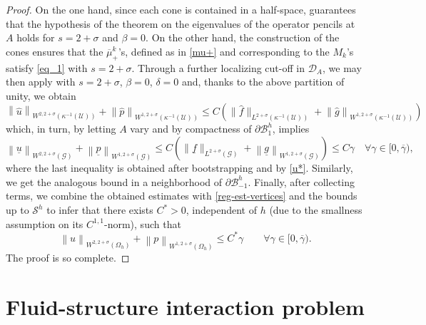 \documentclass[11pt,a4paper]{amsart}
\theoremstyle{remark}
\theoremstyle{definition}
\numberwithin{equation}{section}
\numberwithin{proposition}{section}
\begin{document}
\begin{proof}
On the one hand, since each cone is contained in a half-space, \cite[Section 11.3.1]{Mazya-Rossmann2010} guarantees that the hypothesis of the theorem on the eigenvalues of the operator pencils at $A$ holds for $s=2+\sigma$ and $\beta=0$.
On the other hand, the construction of the cones ensures that the $\overline{\mu}^k_+$'s, defined as in \eqref{mu+} and corresponding to the $M_k$'s satisfy \eqref{eq_1} with $s=2+\sigma$. Through a further localizing cut-off in $\mathcal{D}_A$, we may then  apply \cite[Theorem 10.5.4]{Mazya-Rossmann2010} with $s=2+\sigma$, $\beta=0$, $\delta=0 $ and, thanks to the above partition of unity,  we obtain
\begin{equation*}
\left\|\hat{u}\right\|_{W^{2,2+\sigma}(\kappa^{-1}(\mathcal{U}))}+\left\|\hat{p}\right\|_{W^{1,2+\sigma}(\kappa^{-1}(\mathcal{U}))}\le C\left(\|\hat{f}\|_{L^{2+\sigma}(\kappa^{-1}(\mathcal{U}))}+\left\|\hat{g}\right\|_{W^{1,2+\sigma}(\kappa^{-1}(\mathcal{U}))}\right)
\end{equation*}
which, in turn, by letting $A$ vary and by compactness of $\partial\mathcal{B}_1^h$, implies
\begin{equation*}
\left\|\underline{u}\right\|_{W^{2,2+\sigma}(\mathcal{G})}+\left\|\underline{p}\right\|_{W^{1,2+\sigma}(\mathcal{G})}\le C\left(\|\underline{f}\|_{L^{2+\sigma}(\mathcal{G})}+\left\|\underline{g}\right\|_{W^{1,2+\sigma}(\mathcal{G})}\right)\leq C \gamma  \quad \forall  \gamma\in[0, \overline{\gamma}),
\end{equation*} where the last inequality is obtained after bootstrapping and by \eqref{u*}. Similarly, we get the analogous bound in a neighborhood of $\partial\mathcal{B}_{-1}^h$. Finally, after collecting terms, we combine the obtained estimates with \eqref{reg-est-vertices} and the bounds up to $\mathcal{S}^h$ to infer that there exists $C^*>0$, independent of $h$ (due to the smallness assumption on its $C^{1,1}$-norm), such that
\begin{equation*}
\left\|u\right\|_{W^{2,2+\sigma }(\Omega_h)}+\left\|p\right\|_{W^{1,2+\sigma}(\Omega_h)}\le C^*\gamma \qquad \forall  \gamma\in[0, \overline{\gamma}).
\end{equation*}
The proof is so complete.
\end{proof}


	
\section{Fluid-structure interaction problem}\label{sec_FSI}
\end{document}
